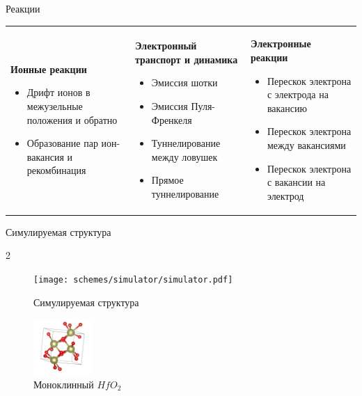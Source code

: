 \documentclass{beamer}%
\begin{document}
\begin{frame} {Реакции}

\begin{tabular}{p{3.3cm} | p{3.3cm}| p{3.3cm}}
    \textbf{Ионные реакции}
    \begin{itemize}
        \item Дрифт ионов в межузельные положения и обратно
        \item Образование пар ион-вакансия и рекомбинация
        
    \end{itemize} &
    \textbf{Электронный транспорт и динамика}
    \begin{itemize}
        \item Эмиссия шотки
        \item Эмиссия Пуля-Френкеля
        \item Туннелирование между ловушек
        \item Прямое туннелирование
    \end{itemize} &
    \textbf{Электронные реакции}
    \begin{itemize}
        \item Перескок электрона с электрода на вакансию
        \item Перескок электрона между вакансиями
        \item Перескок электрона с вакансии на электрод
    \end{itemize}




\end{tabular}

\end{frame}

\begin{frame} {Симулируемая структура}

    \begin {multicols} {2}
    \begin{figure}
        \centering
        \texttt{[image: schemes/simulator/simulator.pdf]}
        \caption {Симулируемая структура}
    \end{figure}
    
    \columnbreak

    \begin{figure}
        \centering
        \includegraphics[height=80px]{img/POSCAR.jpg}
        \vspace {12px}
        \caption {Моноклинный \(HfO_2\)}
    \end{figure}

\end{multicols}


\end{frame}
\end{document}
